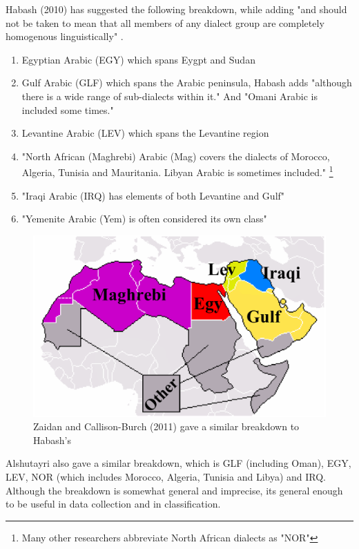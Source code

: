 \documentclass[12pt]{diazessay}
\begin{document}
        Habash (2010) has suggested the following breakdown, while adding "and should not be taken to mean that all members of any dialect group are completely homogenous linguistically" \cite{habash}.
        \begin{enumerate}
            \item Egyptian Arabic (EGY) which spans Eygpt and Sudan
            \item  Gulf Arabic (GLF) which spans the Arabic peninsula, Habash adds "although there is a wide range of sub-dialects within it." And "Omani Arabic is included some times."
            \item Levantine Arabic (LEV) which spans the Levantine region
            \item "North African (Maghrebi) Arabic (Mag) covers the dialects of Morocco, Algeria, Tunisia and Mauritania. Libyan Arabic is sometimes included." \footnote{Many other researchers abbreviate North African dialects as "NOR"}
            \item "Iraqi Arabic (IRQ) has elements of both Levantine and Gulf"
            \item "Yemenite Arabic (Yem) is often considered its own class"
        \end{enumerate}
        
        \begin{figure}[h]
            \centering
            \includegraphics[scale=0.2]{Figures/Zaidan and Burch dialect breakdown.png}
            \caption{Zaidan and Callison-Burch (2011) gave a similar breakdown\cite{zaidan_burch} to Habash's}
            \label{fig:cmp}
        \end{figure}
        
        Alshutayri also gave a similar breakdown, which is GLF (including Oman), EGY, LEV, NOR (which includes Morocco, Algeria, Tunisia and Libya) and IRQ. Although the breakdown is somewhat general and imprecise, its general enough to be useful in data collection and in classification\cite{alshutayri}.
        
\end{document}
